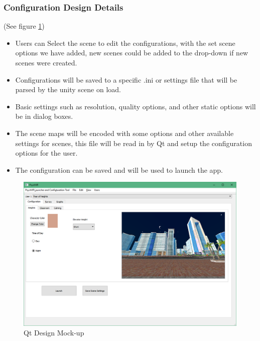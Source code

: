 \documentclass[a4paper,10pt]{article}
\begin{document}
\subsubsection {Configuration Design Details}
(See figure \ref{fig:qtMockupMap})
\begin{itemize}
\item Users can Select the scene to edit the configurations, with the set scene options we have added, new scenes could be added to the drop-down if new scenes were created.
\item Configurations will be saved to a specific .ini or settings file that will be parsed by the unity scene on load.
\item Basic settings such as resolution, quality options, and other static options will be in dialog boxes.
\item The scene maps will be encoded with some options and other available settings for scenes, this file will be read in by Qt and setup the configuration options for the user.
\item The configuration can be saved and will be used to launch the app.

\end{itemize}
\begin{figure}[H]
				    \centerline{\includegraphics[scale = 0.5]{qtHeightSettings.png}}
					\caption{Qt Design Mock-up}
					\label{fig:qtMockupMap}
				\end{figure}
\pagebreak
\end{document}
